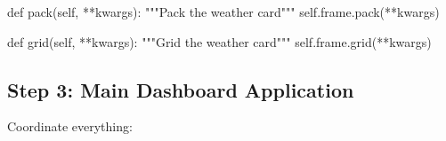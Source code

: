 \documentclass[
  letterpaper,
  DIV=11,
  numbers=noendperiod,
  oneside]{scrreprt}
\newenvironment{Shaded}{}{}
\newcommand{\CommentTok}[1]{\textcolor[rgb]{0.42,0.45,0.49}{#1}}
\newcommand{\KeywordTok}[1]{\textcolor[rgb]{0.84,0.23,0.29}{#1}}
\newcommand{\NormalTok}[1]{\textcolor[rgb]{0.14,0.16,0.18}{#1}}
\newcommand{\OperatorTok}[1]{\textcolor[rgb]{0.14,0.16,0.18}{#1}}
\newcommand{\VariableTok}[1]{\textcolor[rgb]{0.89,0.38,0.04}{#1}}
\begin{document}
\begin{Shaded}
\begin{Highlighting}[]
    \KeywordTok{def}\NormalTok{ pack(}\VariableTok{self}\NormalTok{, }\OperatorTok{**}\NormalTok{kwargs):}
        \CommentTok{"""Pack the weather card"""}
        \VariableTok{self}\NormalTok{.frame.pack(}\OperatorTok{**}\NormalTok{kwargs)}
    
    \KeywordTok{def}\NormalTok{ grid(}\VariableTok{self}\NormalTok{, }\OperatorTok{**}\NormalTok{kwargs):}
        \CommentTok{"""Grid the weather card"""}
        \VariableTok{self}\NormalTok{.frame.grid(}\OperatorTok{**}\NormalTok{kwargs)}
\end{Highlighting}
\end{Shaded}

\subsection{Step 3: Main Dashboard
Application}\label{step-3-main-dashboard-application}

Coordinate everything:
\end{document}
